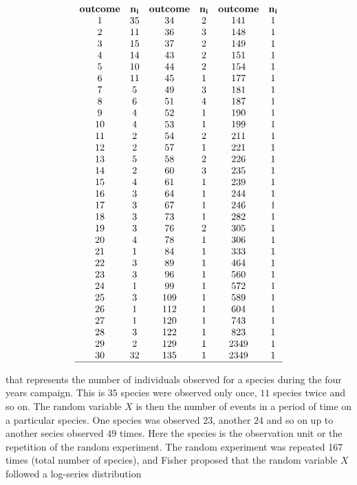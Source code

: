 \documentclass[
]{book}
\begin{document}
\[
\begin{array}{cccccc}
\mathbf{outcome} & \mathbf{n_i} & \mathbf{outcome} & \mathbf{n_i} & \mathbf{outcome} & \mathbf{n_i} \\
1 & 35 & 34 & 2 & 141 & 1 \\
2 & 11 & 36 & 3 & 148 & 1 \\
3 & 15 & 37 & 2 & 149 & 1 \\
4 & 14 & 43 & 2 & 151 & 1 \\
5 & 10 & 44 & 2 & 154 & 1 \\
6 & 11 & 45 & 1 & 177 & 1 \\
7 & 5  & 49 & 3 & 181 & 1 \\
8 & 6  & 51 & 4 & 187 & 1 \\
9 & 4  & 52 & 1 & 190 & 1 \\
10 & 4 & 53 & 1 & 199 & 1 \\
11 & 2 & 54 & 2 & 211 & 1 \\
12 & 2 & 57 & 1 & 221 & 1 \\
13 & 5 & 58 & 2 & 226 & 1 \\
14 & 2 & 60 & 3 & 235 & 1 \\
15 & 4 & 61 & 1 & 239 & 1 \\
16 & 3 & 64 & 1 & 244 & 1 \\
17 & 3 & 67 & 1 & 246 & 1 \\
18 & 3 & 73 & 1 & 282 & 1 \\
19 & 3 & 76 & 2 & 305 & 1 \\
20 & 4 & 78 & 1 & 306 & 1 \\
21 & 1 & 84 & 1 & 333 & 1 \\
22 & 3 & 89 & 1 & 464 & 1 \\
23 & 3 & 96 & 1 & 560 & 1 \\
24 & 1 & 99 & 1 & 572 & 1 \\
25 & 3 & 109 & 1 & 589 & 1 \\
26 & 1 & 112 & 1 & 604 & 1 \\
27 & 1 & 120 & 1 & 743 & 1 \\
28 & 3 & 122 & 1 & 823 & 1 \\
29 & 2 & 129 & 1 & 2349 & 1 \\
30 & 32 & 135 & 1 & 2349 & 1 \\
\hline
\end{array}
\]

that represents the number of individuals observed for a species during the four years campaign. This is \(35\) species were observed only once, \(11\) species twice and so on. The random variable \(X\) is then the number of events in a period of time on a particular species. One species was observed \(23\), another \(24\) and so on up to another secies observed \(49\) times. Here the species is the observation unit or the repetition of the random experiment. The random experiment was repeated 167 times (total number of species), and Fisher proposed that the random variable \(X\) followed a log-series distribution
\end{document}

